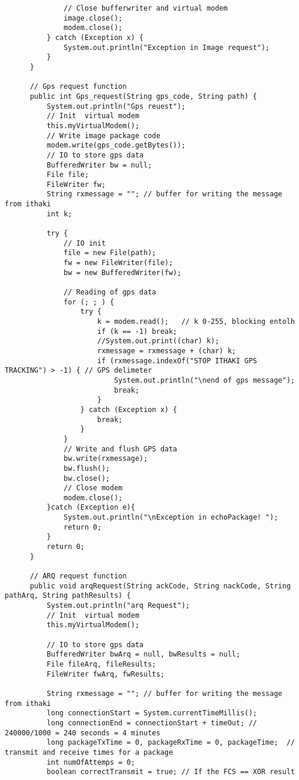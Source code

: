 \documentclass[10pt,a4paper]{article}
\begin{document}
\begin{lstlisting}
              // Close bufferwriter and virtual modem
              image.close();
              modem.close();
          } catch (Exception x) {
              System.out.println("Exception in Image request");
          }
      }
  
      // Gps request function
      public int Gps_request(String gps_code, String path) {
          System.out.println("Gps reuest");
          // Init  virtual modem
          this.myVirtualModem();
          // Write image package code
          modem.write(gps_code.getBytes());
          // IO to store gps data
          BufferedWriter bw = null;
          File file;
          FileWriter fw;
          String rxmessage = ""; // buffer for writing the message from ithaki
          int k;
  
          try {
              // IO init
              file = new File(path);
              fw = new FileWriter(file);
              bw = new BufferedWriter(fw);
  
              // Reading of gps data
              for (; ; ) {
                  try {
                      k = modem.read();   // k 0-255, blocking entolh
                      if (k == -1) break;
                      //System.out.print((char) k);
                      rxmessage = rxmessage + (char) k;
                      if (rxmessage.indexOf("STOP ITHAKI GPS TRACKING") > -1) { // GPS delimeter
                          System.out.println("\nend of gps message");
                          break;
                      }
                  } catch (Exception x) {
                      break;
                  }
              }
              // Write and flush GPS data
              bw.write(rxmessage);
              bw.flush();
              bw.close();
              // Close modem
              modem.close();
          }catch (Exception e){
              System.out.println("\nException in echoPackage! ");
              return 0;
          }
          return 0;
      }
  
      // ARQ request function
      public void arqRequest(String ackCode, String nackCode, String pathArq, String pathResults) {
          System.out.println("arq Request");
          // Init  virtual modem
          this.myVirtualModem();
  
          // IO to store gps data
          BufferedWriter bwArq = null, bwResults = null;
          File fileArq, fileResults;
          FileWriter fwArq, fwResults;
  
          String rxmessage = ""; // buffer for writing the message from ithaki
          long connectionStart = System.currentTimeMillis();
          long connectionEnd = connectionStart + timeOut; // 240000/1000 = 240 seconds = 4 minutes
          long packageTxTime = 0, packageRxTime = 0, packageTime;  // transmit and receive times for a package
          int numOfAttemps = 0;
          boolean correctTransmit = true; // If the FCS == XOR result
          

\end{lstlisting}
\end{document}
